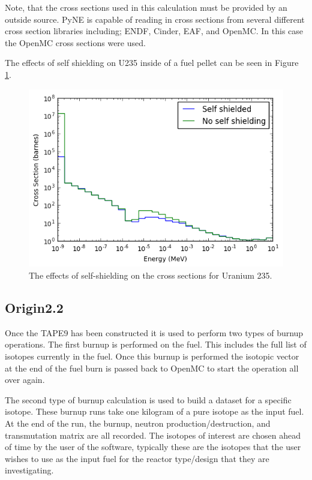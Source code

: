 \documentclass{article}
\begin{document}
Note, that the cross sections used in this calculation must be provided by an outside source. PyNE is capable of reading in cross sections from several different cross section libraries including; ENDF, Cinder, EAF, and OpenMC. In this case the OpenMC cross sections were used.  

The effects of self shielding on U235 inside of a fuel pellet can be seen in Figure \ref{fig:index}.
\begin{figure}[h]
  \center
  \includegraphics[scale=0.8]{index.png}
  \caption{The effects of self-shielding on the cross sections for Uranium 235.}
  \label{fig:index}
\end{figure}

\subsection{Origin2.2}
Once the TAPE9 has been constructed it is used to perform two types of burnup operations. The first burnup is performed on the fuel. This includes the full list of isotopes currently in the fuel. Once this burnup is performed the isotopic vector at the end of the fuel burn is passed back to OpenMC to start the operation all over again.  

The second type of burnup calculation is used to build a dataset for a specific isotope. These burnup runs take one kilogram of a pure isotope as the input fuel. At the end of the run, the burnup, neutron production/destruction, and transmutation matrix are all recorded. The isotopes of interest are chosen ahead of time by the user of the software, typically these are the isotopes that the user wishes to use as the input fuel for the reactor type/design that they are investigating. 
\end{document}
